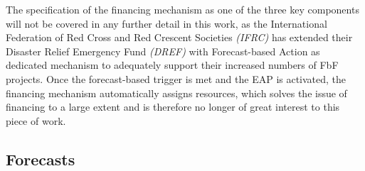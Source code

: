 {%
The specification of the financing mechanism as one of the three key components will not be covered in any further detail in this work, as the International Federation of Red Cross and Red Crescent Societies \textit{(IFRC)} has extended their Disaster Relief Emergency Fund \textit{(DREF)} with Forecast-based Action as dedicated mechanism to adequately support their increased numbers of FbF projects. Once the forecast-based trigger is met and the EAP is activated, the financing mechanism automatically assigns resources, which solves the issue of financing to a large extent and is therefore no longer of great interest to this piece of work.


\subsection{Forecasts} %

}
